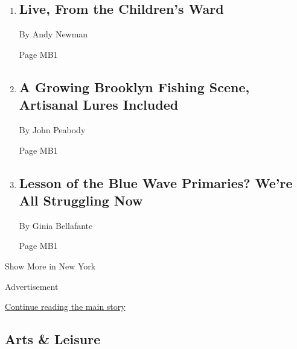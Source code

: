 \begin{enumerate}
\def\labelenumi{\arabic{enumi}.}
\item
  \href{/2018/06/29/nyregion/childrens-hospital-tv-station.html}{}

  \hypertarget{live-from-the-childrens-ward}{%
  \subsection{Live, From the Children's
  Ward}\label{live-from-the-childrens-ward}}

  By Andy Newman

  Page MB1
\item
  \href{/2018/06/28/nyregion/a-growing-brooklyn-fishing-scene-artisanal-lures-included.html}{}

  \hypertarget{a-growing-brooklyn-fishing-scene-artisanal-lures-included}{%
  \subsection{A Growing Brooklyn Fishing Scene, Artisanal Lures
  Included}\label{a-growing-brooklyn-fishing-scene-artisanal-lures-included}}

  By John Peabody

  Page MB1
\item
  \href{/2018/06/28/nyregion/new-york-primaries-lessons-of-ocasio-cortez-victory.html}{}

  \hypertarget{lesson-of-the-blue-wave-primaries-were-all-struggling-now}{%
  \subsection{Lesson of the Blue Wave Primaries? We're All Struggling
  Now}\label{lesson-of-the-blue-wave-primaries-were-all-struggling-now}}

  By Ginia Bellafante

  Page MB1
\end{enumerate}

Show More in New York

Advertisement

\protect\hyperlink{after-mid3}{Continue reading the main story}

\hypertarget{arts--leisure}{%
\subsection{Arts \& Leisure}\label{arts--leisure}}

